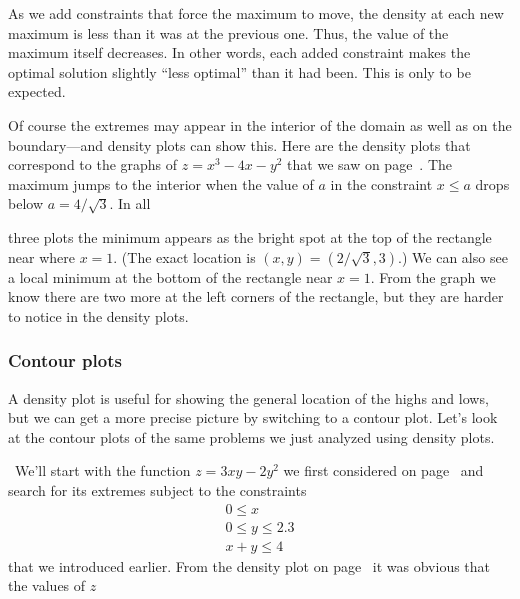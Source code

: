 {{{{        As we add constraints that force the maximum to move, the density at each new maximum is less than it was at the previous one.  Thus, the value of the maximum itself decreases.  
In other words, each added constraint makes the optimal solution slightly ``less optimal'' than it had been.  This is only to be expected.   

        Of course the extremes may appear in the interior 
of the domain as well as on the boundary---and density plots can show this.  Here are the density plots that correspond to the graphs of $z = x^3 - 4x - y^2$ that we saw on page~\pageref{optimum1}.  The maximum jumps to the interior when the value of $a$ in the constraint $x \leq a$ drops below $a = 4/\sqrt{3}$.  In all 
\linebreak 

\vspace{14pt}
\vspace{152pt}

\noindent
three plots the minimum appears as the bright spot at the top of the rectangle near where $x = 1$.  (The exact location is $(x, y) = (2/\sqrt{3}, 3)$.)  We can also see a local minimum at the bottom of the rectangle near $x = 1$.  From the graph we know there are two more at the left corners of the rectangle, but they are harder to notice in the density plots.


\subsubsection{Contour plots}

        A density plot is useful for showing the general location of the highs and lows, but we can get a more precise picture by switching to a contour plot.  Let's look at the contour plots of the same problems we just analyzed using density plots.



\noindent
\quad \ We'll start with the function $z = 3xy - 2 y^2$ we first considered on page~\pageref{density1} and search for its extremes subject to the constraints
        \[
\begin{array}{l}
        0 \leq x        \\ [2pt]
        0 \leq y \leq 2.3       \\ [2pt]
        x + y \leq 4 
        \end{array}
\]
that we introduced earlier.  From the density plot on page~\pageref{density1} it was obvious that the values of $z$ 
\linebreak
 
}}}}
